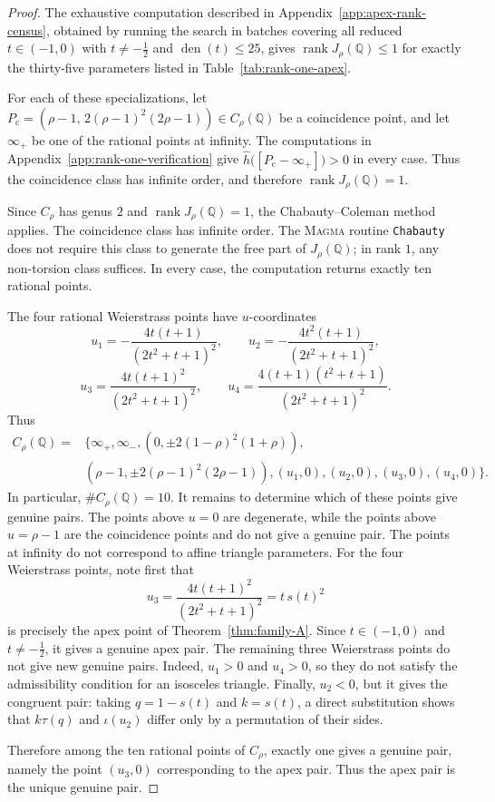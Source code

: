 \documentclass[11pt]{amsart}
\theoremstyle{plain}
\theoremstyle{remark}
\theoremstyle{plain}
\newcommand{\Q}{\mathbb{Q}}
\begin{document}
\begin{proof}
The exhaustive computation described in
Appendix~\ref{app:apex-rank-census}, obtained by running the search
in batches covering all reduced $t\in(-1,0)$ with
$t\ne-\frac12$ and $\operatorname{den}(t)\leq25$, gives
$\operatorname{rank}J_\rho(\Q)\leq1$ for exactly the thirty-five
parameters listed in Table~\ref{tab:rank-one-apex}.



For each of these specializations, let
$P_{\mathrm c}
=
\left(
\rho-1,\,
2(\rho-1)^2(2\rho-1)
\right)
\in C_\rho(\Q)
$
be a coincidence point, and let $\infty_+$ be one of the rational
points at infinity. The computations in
Appendix~\ref{app:rank-one-verification} give
$\widehat h\bigl([P_{\mathrm c}-\infty_+]\bigr)>0$
in every case. Thus the coincidence class has infinite order, and
therefore
$\operatorname{rank}J_\rho(\Q)=1.$

Since $C_\rho$ has genus $2$ and
$\operatorname{rank}J_\rho(\Q)=1$, the Chabauty--Coleman method
applies. The coincidence class has infinite order. The
\textsc{Magma} routine \texttt{Chabauty} does not require this class
to generate the free part of $J_\rho(\Q)$; in rank $1$, any
non-torsion class suffices. In every case, the computation returns
exactly ten rational points.




The four rational Weierstrass points have $u$-coordinates
\[
u_1=-\frac{4t(t+1)}{(2t^2+t+1)^2},\qquad
u_2=-\frac{4t^2(t+1)}{(2t^2+t+1)^2},
\]
\[
u_3=\frac{4t(t+1)^2}{(2t^2+t+1)^2},\qquad
u_4=\frac{4(t+1)(t^2+t+1)}{(2t^2+t+1)^2}.
\]
Thus
\[
\begin{aligned}
C_\rho(\Q)=&\{
\infty_+,\infty_-,
\left(0,\pm2(1-\rho)^2(1+\rho)\right),
\\
&\left(\rho-1,
 \pm2(\rho-1)^2(2\rho-1)\right),
(u_1,0),(u_2,0),(u_3,0),(u_4,0)\}.
\end{aligned}
\]
In particular, $\#C_\rho(\Q)=10$. It remains to determine which of these points give genuine pairs.
The points above $u=0$ are degenerate, while
the points above $u=\rho-1$ are the coincidence points and do not
give a genuine pair. The points at infinity do not
correspond to affine triangle parameters. For the four Weierstrass points, note first that
\[
u_3
=
\frac{4t(t+1)^2}{(2t^2+t+1)^2}
=
t\,s(t)^2
\]
is precisely the apex point of Theorem~\ref{thm:family-A}. Since
$t\in(-1,0)$ and $t\ne-\frac12$, it gives a genuine apex pair. The remaining three Weierstrass points do not give new genuine pairs.
Indeed, $u_1>0$ and $u_4>0$, so they do not satisfy the admissibility
condition
for an isosceles triangle.
Finally, $u_2<0$, but it gives the congruent pair: taking
$q=1-s(t)$ and $k=s(t)$, a direct substitution shows that
$k\tau(q)$ and $\iota(u_2)$ differ only by a permutation of their
sides.


Therefore among the ten rational points of $C_\rho$, exactly one gives
a genuine pair, namely the point $(u_3,0)$ corresponding to the apex
pair. Thus the apex pair is the unique genuine pair.
\end{proof}
\end{document}
